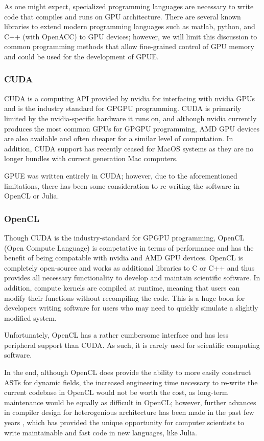 As one might expect, specialized programming languages are necessary to write code that compiles and runs on GPU architecture.
There are several known libraries to extend modern programming languages such as matlab, python, and C++ (with OpenACC) to GPU devices; however, we will limit this discussion to common programming methods that allow fine-grained control of GPU memory and could be used for the development of GPUE.

\subsubsection{CUDA}
CUDA is a computing API provided by nvidia for interfacing with nvidia GPUs and is the industry standard for GPGPU programming.
CUDA is primarily limited by the nvidia-specific hardware it runs on, and although nvidia currently produces the most common GPUs for GPGPU programming, AMD GPU devices are also available and often cheaper for a similar level of computation.
In addition, CUDA support has recently ceased for MacOS systems as they are no longer bundles with current generation Mac computers.

GPUE was written entirely in CUDA; however, due to the aforementioned limitations, there has been some consideration to re-writing the software in OpenCL or Julia.

\subsubsection{OpenCL}

Though CUDA is the industry-standard for GPGPU programming, OpenCL (Open Compute Language) is competative in terms of performance and has the benefit of being compatable with nvidia and AMD GPU devices.
OpenCL is completely open-source and works as additional libraries to C or C++ and thus provides all necessary functionality to develop and maintain scientific software.
In addition, compute kernels are compiled at runtime, meaning that users can modify their functions without recompiling the code.
This is a huge boon for developers writing software for users who may need to quickly simulate a slightly modified system.

Unfortunately, OpenCL has a rather cumbersome interface and has less peripheral support than CUDA.
As such, it is rarely used for scientific computing software.

In the end, although OpenCL does provide the ability to more easily construct ASTs for dynamic fields, the increased engineering time necessary to re-write the current codebase in OpenCL would not be worth the cost, as long-term maintenance would be equally as difficult in  OpenCL; however, further advances in compiler design for heterogenious architecture has been made in the past few years \cite{besard2019}, which has provided the unique opportunity for computer scientists to write maintainable and fast code in new languages, like Julia.

